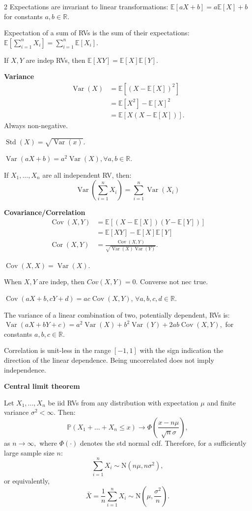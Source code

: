 \documentclass[10pt]{extarticle}
\theoremstyle{definition}
\theoremstyle{remark}
\newcommand{\R}{\mathbb{R}}
\newcommand{\pf}{\mathbb{P}}
\newcommand{\E}{\mathbb{E}}
\DeclareMathOperator{\Cor}{Cor}
\DeclareMathOperator{\Var}{Var}
\DeclareMathOperator{\Std}{Std}
\DeclareMathOperator{\Cov}{Cov}
\begin{document}
\begin{multicols}{2}
    Expectations are invariant to linear transformations: $\E[aX+b] = a\E[X] +
    b$ for constants $a, b \in \R$.

    Expectation of a sum of RVs is the sum of their expectations: 
    $\E\left[ \sum_{i=1}^{n} X_i \right] = \sum_{i=1}^n \E[X_i]$.

    If $X,Y$ are indep RVs, then $\E[XY] = \E[X] \E[Y]$.

    \noindent
    \textbf{Variance}
    \begin{align}
        \Var(X) &= \E\left[ (X - \E[X])^2\right] \\
                &= \E[X^2] - \E[X]^2 \\
                &= \E[X(X - \E[X])].
    \end{align}
    Always non-negative. 

    $\Std(X) = \sqrt{\Var(x)}.$

    $\Var(aX + b) = a^2\Var(X), \forall a, b \in \R$.

    If $X_1, \ldots, X_n$ are all independent RV, then: 
    \[ 
        \Var\left(\sum_{i=1}^n X_i\right) = \sum_{i=1}^n \Var(X_i)
    \]

    \noindent
    \textbf{Covariance/Correlation}
    \begin{align*}
        \Cov(X, Y) &= \E[(X - \E[X])(Y - \E[Y])] \\
                   &= \E[XY] - \E[X] \E[Y] \\
        \Cor(X, Y) &= \frac{\Cov(X, Y)}{\sqrt{\Var(X)\Var(Y)}}.
    \end{align*}

    $\Cov(X, X) = \Var(X).$

    When $X, Y$ are indep, then $Cov(X, Y) = 0$. Converse not nec true. 

    $\Cov(aX + b, cY + d) = ac\Cov(X, Y)$, $\forall a, b, c, d \in \R.$

    The variance of a linear combination of two, potentially dependent, RVs is: 
    $\Var(aX + bY + c) = a^2\Var(X) + b^2\Var(Y) + 2ab\Cov(X, Y),$
    for constants $a, b, c \in \R$.

    Correlation is unit-less in the range $[-1,1]$ with the sign indication the
    direction of the linear dependence. Being uncorrelated does not imply
    independence. 

    \noindent
    \textbf{Central limit theorem}

    Let $X_1, \ldots, X_n$ be iid RVs from any distribution with expectation $\mu$ 
    and finite variance $\sigma^2 < \infty$. Then: \[
        \pf(X_1 + \ldots + X_n \leq x) \to \Phi \left(\frac{x -
        n\mu}{\sqrt{n}\sigma}\right),
    \] as $n \to \infty,$ where $\Phi(\cdot)$ denotes the std normal cdf. 
    Therefore, for a sufficiently large sample size $n$: \[ 
        \sum_{i=1}^n X_i \sim \text{N}(n\mu, n\sigma^2), 
    \] or equivalently, \[
        \bar{X} = \frac{1}{n} \sum_{i = 1}^{n} X_i \sim \text{N}\left(\mu,
        \frac{\sigma^2}{n} \right).
    \]


\end{multicols}
\end{document}
